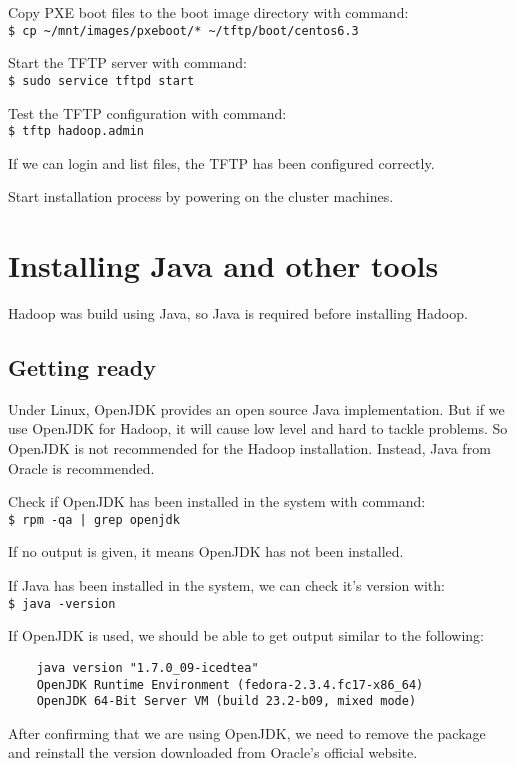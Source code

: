 Copy PXE boot files to the boot image directory with command: \\
\verb|$ cp ~/mnt/images/pxeboot/* ~/tftp/boot/centos6.3|

Start the TFTP server with command: \\
\verb|$ sudo service tftpd start|
  
Test the TFTP configuration with command: \\
\verb|$ tftp hadoop.admin|

If we can login and list files, the TFTP has been configured correctly.
  
Start installation process by powering on the cluster machines.

\section{Installing Java and other tools}
Hadoop was build using Java, so Java is required before installing Hadoop.

\subsection*{Getting ready}
Under Linux, OpenJDK provides an open source Java implementation. But if we use OpenJDK for Hadoop, it will cause low level and hard to tackle problems. So OpenJDK is not recommended for the Hadoop installation. Instead, Java from Oracle is recommended.

Check if OpenJDK has been installed in the system with command: \\
\verb+$ rpm -qa | grep openjdk+

If no output is given, it means OpenJDK has not been installed.

If Java has been installed in the system, we can check it's version with: \\
\verb|$ java -version|

If OpenJDK is used, we should be able to get output similar to the following:

\begin{verbatim}
    java version "1.7.0_09-icedtea"
    OpenJDK Runtime Environment (fedora-2.3.4.fc17-x86_64)
    OpenJDK 64-Bit Server VM (build 23.2-b09, mixed mode)
\end{verbatim}

After confirming that we are using OpenJDK, we need to remove the package and reinstall the version downloaded from Oracle's official website.

